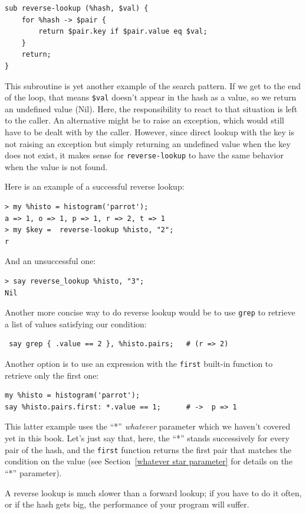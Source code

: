 \begin{verbatim}
sub reverse-lookup (%hash, $val) { 
    for %hash -> $pair { 
        return $pair.key if $pair.value eq $val;
    }
    return;
}
\end{verbatim}
%
This subroutine is yet another example of the search pattern.
If we get to the end of the loop, that means \verb'$val'
doesn't appear in the hash as a value, so we return an 
undefined value (Nil). Here, the responsibility to react 
to that situation is left to the caller. An alternative 
might be to raise an exception, which would still have 
to be dealt with by the caller. However, since direct 
lookup with the key is not raising an exception but simply 
returning an undefined value when the key does not exist, 
it makes sense for {\tt reverse-lookup} to have the same 
behavior when the value is not found.

Here is an example of a successful reverse lookup:

\begin{verbatim}
> my %histo = histogram('parrot');
a => 1, o => 1, p => 1, r => 2, t => 1
> my $key =  reverse-lookup %histo, "2";
r
\end{verbatim}
%
And an unsuccessful one:

\begin{verbatim}
> say reverse_lookup %histo, "3";
Nil
\end{verbatim}
%

Another more concise way to do reverse lookup would be to 
use {\tt grep} to retrieve a list of values satisfying our 
condition:
\begin{verbatim}
 say grep { .value == 2 }, %histo.pairs;   # (r => 2)
\end{verbatim}

Another option is to use an expression with the {\tt first} 
built-in function to retrieve only the first one:
\begin{verbatim}
my %histo = histogram('parrot');
say %histo.pairs.first: *.value == 1;      # ->  p => 1
\end{verbatim}

This latter example uses the ``*'' \emph{whatever} parameter 
which we haven't covered yet in this book. Let's just say that, 
here, the ``*'' stands successively for every pair of the hash, 
and the {\tt first} function returns the first pair that matches 
the condition on the value (see 
Section~\ref{whatever star parameter} for details on the 
``*'' parameter).

A reverse lookup is much slower than a forward lookup; if you
have to do it often, or if the hash gets big, the performance
of your program will suffer.

